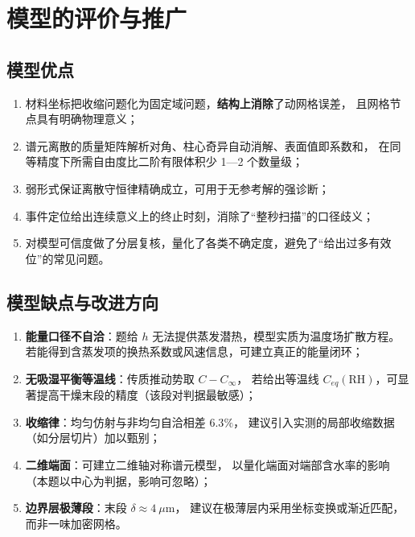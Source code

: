 \documentclass[12pt,a4paper]{ctexart}
\begin{document}
\section{模型的评价与推广}

\subsection{模型优点}
\begin{enumerate}[label=\arabic*),leftmargin=1.8em,itemsep=1pt]
  \item 材料坐标把收缩问题化为固定域问题，\textbf{结构上消除}了动网格误差，
        且网格节点具有明确物理意义；
  \item 谱元离散的质量矩阵解析对角、柱心奇异自动消解、表面值即系数和，
        在同等精度下所需自由度比二阶有限体积少 1—2 个数量级；
  \item 弱形式保证离散守恒律精确成立，可用于无参考解的强诊断；
  \item 事件定位给出连续意义上的终止时刻，消除了“整秒扫描”的口径歧义；
  \item 对模型可信度做了分层复核，量化了各类不确定度，避免了“给出过多有效位”的常见问题。
\end{enumerate}

\subsection{模型缺点与改进方向}
\begin{enumerate}[label=\arabic*),leftmargin=1.8em,itemsep=1pt]
  \item \textbf{能量口径不自洽}：题给 $h$ 无法提供蒸发潜热，模型实质为温度场扩散方程。
        若能得到含蒸发项的换热系数或风速信息，可建立真正的能量闭环；
  \item \textbf{无吸湿平衡等温线}：传质推动势取 $C-C_\infty$，
        若给出等温线 $C_{eq}(\text{RH})$，可显著提高干燥末段的精度（该段对判据最敏感）；
  \item \textbf{收缩律}：均匀仿射与非均匀自洽相差 $6.3\%$，
        建议引入实测的局部收缩数据（如分层切片）加以甄别；
  \item \textbf{二维端面}：可建立二维轴对称谱元模型，
        以量化端面对端部含水率的影响（本题以中心为判据，影响可忽略）；
  \item \textbf{边界层极薄段}：末段 $\delta\approx4\ \mu$m，
        建议在极薄层内采用坐标变换或渐近匹配，而非一味加密网格。
\end{enumerate}
\end{document}
